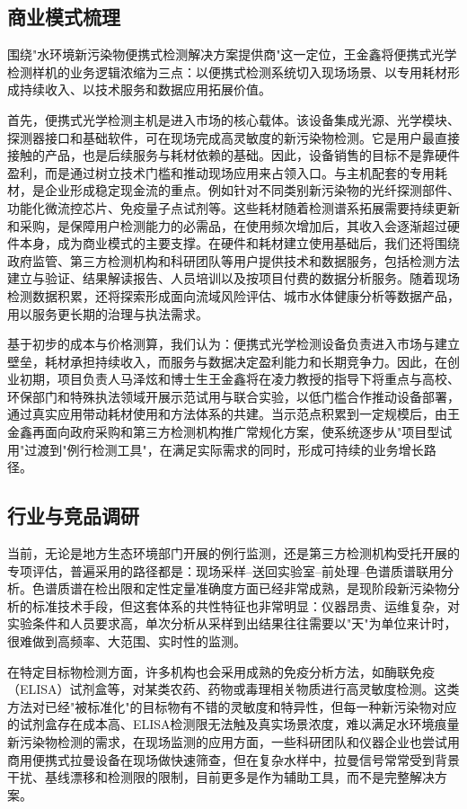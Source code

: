 \documentclass[12pt,a4paper]{article}
\begin{document}
\subsection{商业模式梳理}

围绕"水环境新污染物便携式检测解决方案提供商"这一定位，王金鑫将便携式光学检测样机的业务逻辑浓缩为三点：以便携式检测系统切入现场场景、以专用耗材形成持续收入、以技术服务和数据应用拓展价值。

首先，便携式光学检测主机是进入市场的核心载体。该设备集成光源、光学模块、探测器接口和基础软件，可在现场完成高灵敏度的新污染物检测。它是用户最直接接触的产品，也是后续服务与耗材依赖的基础。因此，设备销售的目标不是靠硬件盈利，而是通过树立技术门槛和推动现场应用来占领入口。与主机配套的专用耗材，是企业形成稳定现金流的重点。例如针对不同类别新污染物的光纤探测部件、功能化微流控芯片、免疫量子点试剂等。这些耗材随着检测谱系拓展需要持续更新和采购，是保障用户检测能力的必需品，在使用频次增加后，其收入会逐渐超过硬件本身，成为商业模式的主要支撑。在硬件和耗材建立使用基础后，我们还将围绕政府监管、第三方检测机构和科研团队等用户提供技术和数据服务，包括检测方法建立与验证、结果解读报告、人员培训以及按项目付费的数据分析服务。随着现场检测数据积累，还将探索形成面向流域风险评估、城市水体健康分析等数据产品，用以服务更长期的治理与执法需求。

基于初步的成本与价格测算，我们认为：便携式光学检测设备负责进入市场与建立壁垒，耗材承担持续收入，而服务与数据决定盈利能力和长期竞争力。因此，在创业初期，项目负责人马泽炫和博士生王金鑫将在凌力教授的指导下将重点与高校、环保部门和特殊执法领域开展示范试用与联合实验，以低门槛合作推动设备部署，通过真实应用带动耗材使用和方法体系的共建。当示范点积累到一定规模后，由王金鑫再面向政府采购和第三方检测机构推广常规化方案，使系统逐步从"项目型试用"过渡到"例行检测工具"，在满足实际需求的同时，形成可持续的业务增长路径。

\subsection{行业与竞品调研}

当前，无论是地方生态环境部门开展的例行监测，还是第三方检测机构受托开展的专项评估，普遍采用的路径都是：现场采样--送回实验室--前处理--色谱质谱联用分析。色谱质谱在检出限和定性定量准确度方面已经非常成熟，是现阶段新污染物分析的标准技术手段，但这套体系的共性特征也非常明显：仪器昂贵、运维复杂，对实验条件和人员要求高，单次分析从采样到出结果往往需要以"天"为单位来计时，很难做到高频率、大范围、实时性的监测。

在特定目标物检测方面，许多机构也会采用成熟的免疫分析方法，如酶联免疫（ELISA）试剂盒等，对某类农药、药物或毒理相关物质进行高灵敏度检测。这类方法对已经"被标准化"的目标物有不错的灵敏度和特异性，但每一种新污染物对应的试剂盒存在成本高、ELISA检测限无法触及真实场景浓度，难以满足水环境痕量新污染物检测的需求，在现场监测的应用方面，一些科研团队和仪器企业也尝试用商用便携式拉曼设备在现场做快速筛查，但在复杂水样中，拉曼信号常常受到背景干扰、基线漂移和检测限的限制，目前更多是作为辅助工具，而不是完整解决方案。
\end{document}

